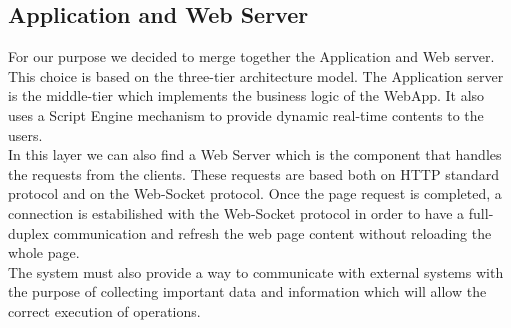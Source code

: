 \documentclass[numbers=noenddot, 12pt, a4paper, oneside]{scrbook}
\begin{document}
\subsection*{Application and Web Server}

For our purpose we decided to merge together the Application and Web server. This choice is based on the three-tier architecture model. The Application server is the middle-tier which implements the business logic of the WebApp. It also uses a Script Engine mechanism to provide dynamic real-time contents to the users.\\

In this layer we can also find a Web Server which is the component that handles the requests from the clients. These requests are based both on HTTP standard protocol and on the Web-Socket protocol. Once the page request is completed, a connection is estabilished with the Web-Socket protocol in order to have a full-duplex communication and refresh the web page content without reloading the whole page.\\

The system must also provide a way to communicate with external systems with the purpose of collecting important data and information which will allow the correct execution of operations.\\
\end{document}
